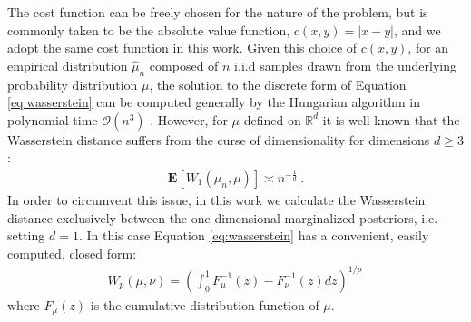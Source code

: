 \documentclass[fleqn,usenatbib,useAMS]{mnras}
\begin{document}
The cost function can be freely chosen for the nature of the problem, but is commonly taken to be the absolute value function, $c(x,y) = |x-y|$, and we adopt the same cost function in this work. Given this choice of $c(x,y)$, for an empirical distribution $\hat{\mu}_n$ composed of $n$ i.i.d samples drawn from the underlying probability distribution $\mu$, the solution to the discrete form of Equation \eqref{eq:wasserstein} can be computed generally by the Hungarian algorithm \citep{Kuhn} in polynomial time $\mathcal{O}(n^3)$ \citep{Villani2009}. However, for $\mu$ defined on $\mathbb{R}^d$ it is well-known \citep{Dudley} that the Wasserstein distance suffers from the curse of dimensionality for dimensions $d \geq 3$:
\begin{eqnarray}
	\boldsymbol{E} [W_1(\hat{\mu}_n,\mu)] \asymp n^{-\frac{1}{d}} \ .
\end{eqnarray}
In order to circumvent this issue, in this work we calculate the Wasserstein distance exclusively between the one-dimensional marginalized posteriors, i.e. setting $d=1$. In this case Equation \eqref{eq:wasserstein} has a convenient, easily computed, closed form:
\begin{eqnarray}
	W_p(\mu,\nu)= \left(\int_0^1  F_{\mu}^{-1} (z) - F_{\nu}^{-1} (z) dz \right)^{1/p} \, \label{eq:wasserstein}
\end{eqnarray}
where $F_{\mu}(z)$ is the cumulative distribution function of $\mu$. \newline  
\end{document}
